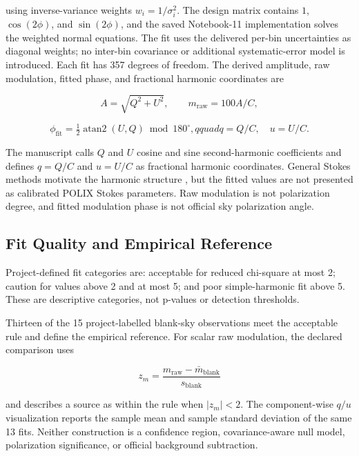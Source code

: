 \documentclass[conference]{IEEEtran}
\begin{document}
using inverse-variance weights $w_i=1/\sigma_i^2$. The design matrix contains $1$, $\cos(2\phi)$, and $\sin(2\phi)$, and the saved Notebook-11 implementation solves the weighted normal equations. The fit uses the delivered per-bin uncertainties as diagonal weights; no inter-bin covariance or additional systematic-error model is introduced. Each fit has 357 degrees of freedom. The derived amplitude, raw modulation, fitted phase, and fractional harmonic coordinates are


\begin{equation*}
A=\sqrt{Q^2+U^2},\qquad
m_{\mathrm{raw}}=100A/C,
\end{equation*}

\begin{equation*}
\phi_{\mathrm{fit}}=\tfrac12\operatorname{atan2}(U,Q)\bmod180^\circ,qquad
q=Q/C,\quad u=U/C.
\end{equation*}

The manuscript calls $Q$ and $U$ cosine and sine second-harmonic coefficients and defines $q=Q/C$ and $u=U/C$ as fractional harmonic coordinates. General Stokes methods motivate the harmonic structure \cite{kislat2015stokes}, but the fitted values are not presented as calibrated POLIX Stokes parameters. Raw modulation is not polarization degree, and fitted modulation phase is not official sky polarization angle.


\subsection{Fit Quality and Empirical Reference}

Project-defined fit categories are: acceptable for reduced chi-square at most 2; caution for values above 2 and at most 5; and poor simple-harmonic fit above 5. These are descriptive categories, not p-values or detection thresholds.


Thirteen of the 15 project-labelled blank-sky observations meet the acceptable rule and define the empirical reference. For scalar raw modulation, the declared comparison uses


\begin{equation*}
z_m=\frac{m_{\mathrm{raw}}-\bar m_{\mathrm{blank}}}{s_{\mathrm{blank}}}
\end{equation*}

and describes a source as within the rule when $|z_m|<2$. The component-wise $q/u$ visualization reports the sample mean and sample standard deviation of the same 13 fits. Neither construction is a confidence region, covariance-aware null model, polarization significance, or official background subtraction.
\end{document}
